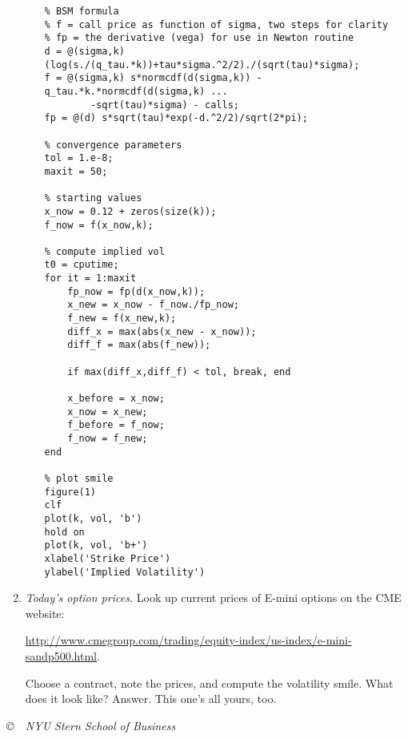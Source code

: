 \documentclass[11pt]{article}
\begin{document}
\begin{enumerate}
\begin{enumerate}
\begin{verbatim}
% BSM formula
% f = call price as function of sigma, two steps for clarity
% fp = the derivative (vega) for use in Newton routine
d = @(sigma,k) (log(s./(q_tau.*k))+tau*sigma.^2/2)./(sqrt(tau)*sigma);
f = @(sigma,k) s*normcdf(d(sigma,k)) - q_tau.*k.*normcdf(d(sigma,k) ...
        -sqrt(tau)*sigma) - calls;
fp = @(d) s*sqrt(tau)*exp(-d.^2/2)/sqrt(2*pi);

% convergence parameters
tol = 1.e-8;
maxit = 50;

% starting values
x_now = 0.12 + zeros(size(k));
f_now = f(x_now,k);

% compute implied vol
t0 = cputime;
for it = 1:maxit
    fp_now = fp(d(x_now,k));
    x_new = x_now - f_now./fp_now;
    f_new = f(x_new,k);
    diff_x = max(abs(x_new - x_now));
    diff_f = max(abs(f_new));

    if max(diff_x,diff_f) < tol, break, end

    x_before = x_now;
    x_now = x_new;
    f_before = f_now;
    f_now = f_new;
end

% plot smile
figure(1)
clf
plot(k, vol, 'b')
hold on
plot(k, vol, 'b+')
xlabel('Strike Price')
ylabel('Implied Volatility')
\end{verbatim}
\end{enumerate}

\item {\it Today's option prices.\/}
Look up current prices of E-mini options
on the CME website:

{\small
\url{http://www.cmegroup.com/trading/equity-index/us-index/e-mini-sandp500.html}.
}

Choose a contract, note the prices, and compute the volatility smile.
What does it look like?
%
Answer.  This one's all yours, too.

\end{enumerate}




\vfill
{\vspace*{0.2in}
\centerline{\it \copyright \ \number\year \
NYU Stern School of Business}
}
\end{document}
